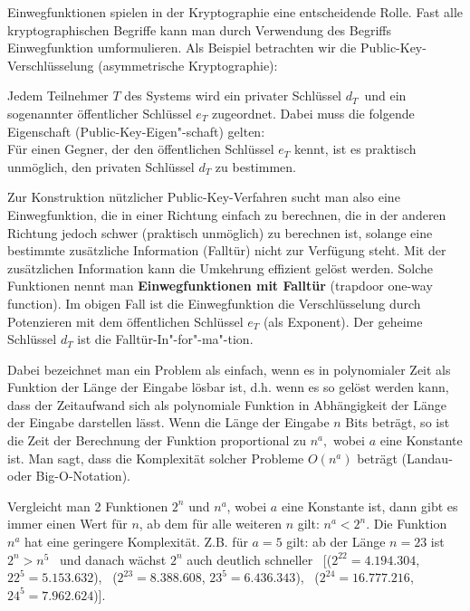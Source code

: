\begin{refsegment}
Einwegfunktionen spielen in der Kryptographie eine entscheidende Rolle. Fast alle kryptographischen Begriffe kann man durch Verwendung des Begriffs Einwegfunktion umformulieren. Als Beispiel betrachten wir die Public-Key-Verschlüsselung  (asymmetrische Kryptographie):\par

Jedem Teilnehmer $ T $ des Systems wird ein privater 
 Schlüssel $d_T$~\mbox{und} ein sogenannter öffentlicher
Schlüssel $ e_T $ zugeordnet. Dabei muss die folgende Eigenschaft (Public-Key-Eigen"-schaft)
gelten:\\
Für einen Gegner, der den öffentlichen Schlüssel $ e_T $ kennt, ist es praktisch unmöglich,
den privaten Schlüssel  $ d_T $ zu bestimmen.\par

Zur Konstruktion nützlicher Public-Key-Verfahren sucht man also eine Einwegfunktion, die in einer Richtung \glqq einfach\grqq {} zu berechnen, die in der anderen Richtung jedoch \glqq schwer\grqq {} (praktisch unmöglich) zu berechnen ist, solange eine bestimmte zusätzliche Information  (Falltür) nicht zur Verfügung steht. Mit der zusätzlichen Information kann die Umkehrung effizient gelöst werden. Solche Funktionen nennt man \textbf{Einwegfunktionen mit Falltür} (trapdoor one-way function). Im obigen Fall ist die Einwegfunktion die Verschlüsselung durch Potenzieren mit dem öffentlichen Schl\"ussel $e_T$ (als Exponent). Der geheime Schlüssel $ d_T $ ist die Falltür-In"-for"-ma"-tion.\par

Dabei bezeichnet man ein Problem als \glqq einfach\grqq, wenn es in   polynomialer Zeit als Funktion der Länge der Eingabe lösbar ist, d.h. wenn es so gelöst werden kann, dass der Zeitaufwand sich als polynomiale Funktion in Abhängigkeit der Länge der Eingabe darstellen lässt.
Wenn die Länge der Eingabe $ n $ Bits beträgt, so ist die Zeit der Berechnung der Funktion proportional zu $ n^{a}, $ wobei $ a $  eine Konstante ist. Man sagt, dass die  Komplexität solcher Probleme $ O(n^{a}) $ beträgt (Landau- oder Big-O-Notation).

Vergleicht man 2 Funktionen  $ 2^n $  und   $ n^{a} $, wobei $ a $
eine Konstante ist, dann gibt es immer einen Wert für  $ n $, ab dem
für alle weiteren $ n $ gilt: $ n^{a}  <  2^n $.
Die Funktion  $ n^{a} $  hat eine geringere Komplexität.
Z.B. für $ a=5 $ gilt: ab der Länge $ n=23 $ ist
$ 2^n > n^5 $ ~\mbox{und} danach wächst $ 2^n $ auch deutlich
schneller \
[($ 2^{22}= 4.194.304 $, $ 22^5= 5.153.632 $), \
 ($ 2^{23}= 8.388.608 $, $ 23^5= 6.436.343 $), \
 ($ 2^{24}=16.777.216 $, $ 24^5= 7.962.624 $)].\par


\end{refsegment}
